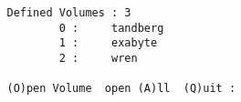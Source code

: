 \begin{screendump}
  \begin{verbatim}
   Defined Volumes : 3
           0 :     tandberg
           1 :     exabyte
           2 :     wren

   (O)pen Volume  open (A)ll  (Q)uit :
  \end{verbatim}
\end{screendump}
